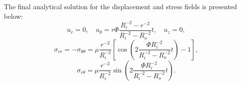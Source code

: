 The final analytical solution for the displacement and stress fields is presented below:
\begin{equation}
  u_r = 0, \quad u_\theta = r \Phi \frac{R_i^{-2} - r^{-2}}{R_i^{-2} - R_o^{-2}} t, \quad u_z = 0,
\end{equation}
\begin{equation}
  \sigma_{rr} = - \sigma_{\theta \theta} = \mu \frac{r^{-2}}{R_i^{-2}} \left[ \cos \left( 2 \frac{\Phi R_i^{-2}}{R_i^{-2} - R_o^{-2}} t \right) - 1 \right],
\end{equation}
\begin{equation}
  \sigma_{r \theta} = \mu \frac{r^{-2}}{R_i^{-2}} \sin \left( 2 \frac{\Phi R_i^{-2}}{R_i^{-2} - R_o^{-2}} t \right).
\end{equation}